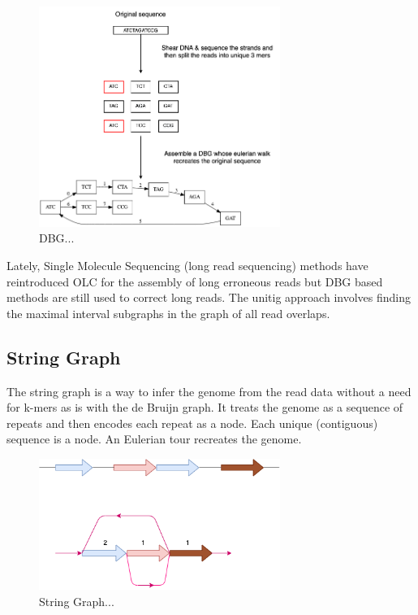 \documentclass[11pt]{article}
\begin{document}
\begin{figure}[H]
\centering
\includegraphics[width=0.7\textwidth]{figures/de Bruijn Graph.png}
\caption{DBG...}
\end{figure}

Lately, Single Molecule Sequencing (long read sequencing)  methods have 
reintroduced OLC for the assembly of long erroneous reads but DBG based methods 
are still used to correct long reads.
The unitig approach involves finding the maximal interval subgraphs in the
graph of all read overlaps.

\subsection{String Graph}
\label{sec:org048d3af}
The string graph \cite{myersFragmentAssemblyString2005} is a way to infer the 
genome from the read data without a need for k-mers as is with the de Bruijn 
graph.  It treats the genome as a sequence of repeats and then encodes each 
repeat as a node. Each unique (contiguous) sequence is a node. 
An Eulerian tour recreates the genome.

\begin{figure}[H]
\centering
\includegraphics[width=0.7\textwidth]{figures/String Graph.png}
\caption{String Graph...}
\end{figure}\label{string graph}
\end{document}
